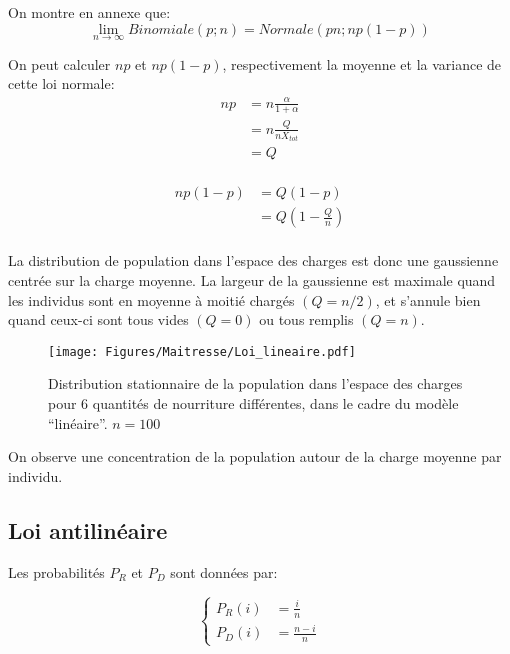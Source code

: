 On montre en annexe que: $$\lim_{n\rightarrow\infty} Binomiale(p;n) = Normale(pn;np(1-p))$$

On peut calculer $np$ et $np(1-p)$, respectivement la moyenne et la variance de cette loi normale:
\begin{equation}
\begin{aligned}
np	&= n \frac{\alpha}{1+\alpha}\\
	&= n \frac{Q}{nX_{tot}}\\
	&= Q\\
\end{aligned}
\end{equation}

\begin{equation}
\begin{aligned}
np(1-p) &= Q(1-p)\\
		&= Q(1-\frac{Q}{n})\\
\end{aligned}
\end{equation}

La distribution de population dans l'espace des charges est donc une gaussienne centrée sur la charge moyenne. La largeur de la gaussienne est maximale quand les individus sont en moyenne à moitié chargés $(Q=n/2)$, et s'annule bien quand ceux-ci sont tous vides $(Q=0)$ ou tous remplis $(Q=n)$.


\begin{figure}[h]
\centering
\texttt{[image: Figures/Maitresse/Loi\_lineaire.pdf]}
\caption{Distribution stationnaire de la population dans l'espace des charges pour 6 quantités de nourriture différentes, dans le cadre du modèle ``linéaire''. $n=100$}
\label{DistribAnalytiqueLin}
\end{figure}

On observe une concentration de la population autour de la charge moyenne par individu.



\subsection{Loi antilinéaire}
Les probabilités $P_R$ et $P_D$ sont données par:

\begin{equation}
\left \{
\begin{aligned}
P_R(i) &= \frac{i}{n}\\
P_D(i) &= \frac{n-i}{n}
\end{aligned}
\right.
\end{equation}

